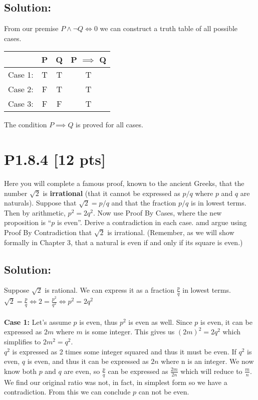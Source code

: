 \documentclass[12pt]{article}
\begin{document}
\subsection*{\textbf{Solution:}}
 From our premise $P \land \neg Q \iff 0$ we can construct a truth table of all possible cases.
\begin{center}
\begin{tabular}{ |c|c|c|c| } 
 \hline
& P & Q & P $\implies$ Q \\ 
\hline
Case 1: & T & T & T \\ 
Case 2: & F & T & T \\
Case 3: & F & F & T \\
 \hline
\end{tabular}
\end{center}
The condition $P \implies Q$ is proved for all cases.


\newpage
\section*{\textbf{P1.8.4} [12 pts]}
Here you will complete a famous proof, known to the ancient Greeks, that the number $\sqrt{2}$ is \textbf{irrational} (that it cannot be expressed as $p/q$ where $p$ and $q$ are naturals). Suppose that $\sqrt{2} = p/q$ and that the fraction $p/q$ is in lowest terms. Then by arithmetic, $p^2 = 2q^2$. Now
use Proof By Cases, where the new proposition is “$p$ is even”. Derive a contradiction in each case. amd argue using Proof By Contradiction that $\sqrt{2}$ is irrational. (Remember, as we will show formally in Chapter 3, that a natural is even if and only if its square is even.)

\subsection*{\textbf{Solution:}}
Suppose $\sqrt{2}$ is rational. We can express it as a fraction $\frac{p}{q}$ in lowest terms.\\
$\sqrt{2} = \frac{p}{q} \iff 2 = \frac{p^2}{q^2} \iff p^2 = 2q^2$ \\\\

\textbf{Case 1:}
Let's assume $p$ is even, thus $p^2$ is even as well. Since $p$ is even, it can be expressed as $2m$ where $m$ is some integer. This gives us $(2m)^2 = 2q^2$ which simplifies to $2m^2 = q^2$.\\

$q^2$ is expressed as 2 times some integer squared and thus it must be even. If $q^2$ is even, $q$ is even, and thus it can be expressed as $2n$ where n is an integer. We now know both $p$ and $q$ are even, so $\frac{p}{q}$ can be expressed as $\frac{2m}{2n}$ which will reduce to $\frac{m}{n}$. We find our original ratio was not, in fact, in simplest form so we have a contradiction. From this we can conclude $p$ can not be even.\\
\end{document}
